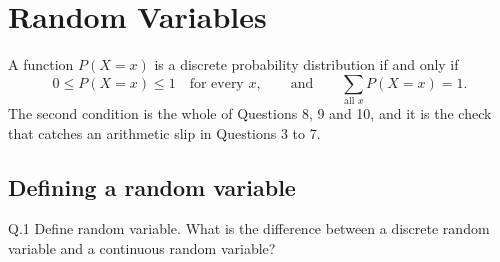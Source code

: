 \chapter{Random Variables}


\begin{keyidea}
A function $P(X=x)$ is a discrete probability distribution if and only if
\[
0\le P(X=x)\le 1 \quad\text{for every }x,
\qquad\text{and}\qquad
\sum_{\text{all }x}P(X=x)=1 .
\]
The second condition is the whole of Questions 8, 9 and 10, and it is the check
that catches an arithmetic slip in Questions 3 to 7.
\end{keyidea}

\section{Defining a random variable}

\begin{question}{Q.1}
Define random variable. What is the difference between a discrete random
variable and a continuous random variable?
\end{question}

